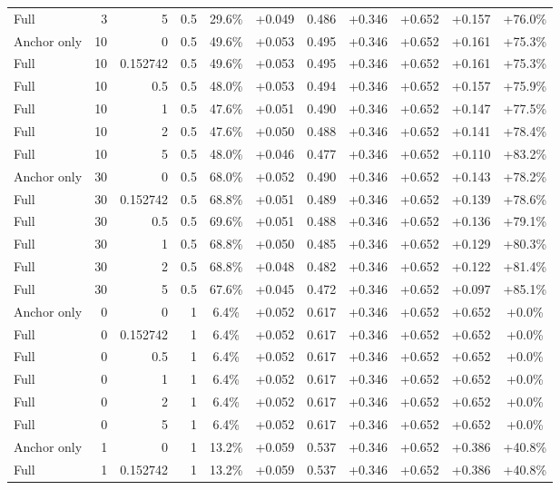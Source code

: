 \begin{table}[htbp]
\begin{tabular}{lrrrccccccc}
Full & 3 & 5 & 0.5 & 29.6\% & +0.049 & 0.486 & +0.346 & +0.652 & +0.157 & +76.0\% \\
Anchor only & 10 & 0 & 0.5 & 49.6\% & +0.053 & 0.495 & +0.346 & +0.652 & +0.161 & +75.3\% \\
Full & 10 & 0.152742 & 0.5 & 49.6\% & +0.053 & 0.495 & +0.346 & +0.652 & +0.161 & +75.3\% \\
Full & 10 & 0.5 & 0.5 & 48.0\% & +0.053 & 0.494 & +0.346 & +0.652 & +0.157 & +75.9\% \\
Full & 10 & 1 & 0.5 & 47.6\% & +0.051 & 0.490 & +0.346 & +0.652 & +0.147 & +77.5\% \\
Full & 10 & 2 & 0.5 & 47.6\% & +0.050 & 0.488 & +0.346 & +0.652 & +0.141 & +78.4\% \\
Full & 10 & 5 & 0.5 & 48.0\% & +0.046 & 0.477 & +0.346 & +0.652 & +0.110 & +83.2\% \\
Anchor only & 30 & 0 & 0.5 & 68.0\% & +0.052 & 0.490 & +0.346 & +0.652 & +0.143 & +78.2\% \\
Full & 30 & 0.152742 & 0.5 & 68.8\% & +0.051 & 0.489 & +0.346 & +0.652 & +0.139 & +78.6\% \\
Full & 30 & 0.5 & 0.5 & 69.6\% & +0.051 & 0.488 & +0.346 & +0.652 & +0.136 & +79.1\% \\
Full & 30 & 1 & 0.5 & 68.8\% & +0.050 & 0.485 & +0.346 & +0.652 & +0.129 & +80.3\% \\
Full & 30 & 2 & 0.5 & 68.8\% & +0.048 & 0.482 & +0.346 & +0.652 & +0.122 & +81.4\% \\
Full & 30 & 5 & 0.5 & 67.6\% & +0.045 & 0.472 & +0.346 & +0.652 & +0.097 & +85.1\% \\
Anchor only & 0 & 0 & 1 & 6.4\% & +0.052 & 0.617 & +0.346 & +0.652 & +0.652 & +0.0\% \\
Full & 0 & 0.152742 & 1 & 6.4\% & +0.052 & 0.617 & +0.346 & +0.652 & +0.652 & +0.0\% \\
Full & 0 & 0.5 & 1 & 6.4\% & +0.052 & 0.617 & +0.346 & +0.652 & +0.652 & +0.0\% \\
Full & 0 & 1 & 1 & 6.4\% & +0.052 & 0.617 & +0.346 & +0.652 & +0.652 & +0.0\% \\
Full & 0 & 2 & 1 & 6.4\% & +0.052 & 0.617 & +0.346 & +0.652 & +0.652 & +0.0\% \\
Full & 0 & 5 & 1 & 6.4\% & +0.052 & 0.617 & +0.346 & +0.652 & +0.652 & +0.0\% \\
Anchor only & 1 & 0 & 1 & 13.2\% & +0.059 & 0.537 & +0.346 & +0.652 & +0.386 & +40.8\% \\
Full & 1 & 0.152742 & 1 & 13.2\% & +0.059 & 0.537 & +0.346 & +0.652 & +0.386 & +40.8\% \\

\end{tabular}
\end{table}
